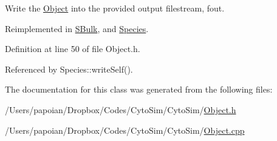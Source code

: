 Write the \hyperlink{classObject}{Object} into the provided output filestream, fout. 



Reimplemented in \hyperlink{classSBulk_af96d228dfe5348a5a7944b69c3ddf8fa}{S\-Bulk}, and \hyperlink{classSpecies_a8a2ec8930dd89c427245f0013aea9c69}{Species}.



Definition at line 50 of file Object.\-h.



Referenced by Species\-::write\-Self().



The documentation for this class was generated from the following files\-:\begin{DoxyCompactItemize}
\item 
/\-Users/papoian/\-Dropbox/\-Codes/\-Cyto\-Sim/\-Cyto\-Sim/\hyperlink{Object_8h}{Object.\-h}\item 
/\-Users/papoian/\-Dropbox/\-Codes/\-Cyto\-Sim/\-Cyto\-Sim/\hyperlink{Object_8cpp}{Object.\-cpp}\end{DoxyCompactItemize}
